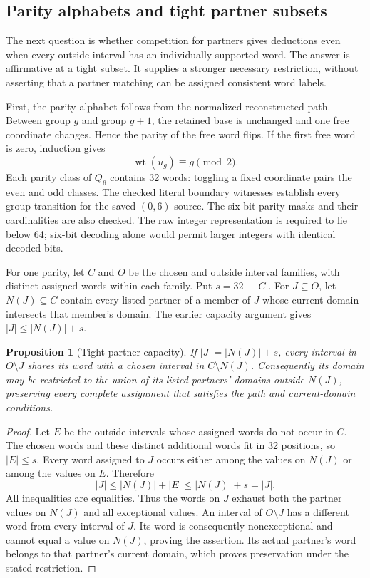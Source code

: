 \documentclass[11pt,a4paper]{article}
\newtheorem{proposition}[theorem]{Proposition}
\theoremstyle{definition}
\theoremstyle{remark}
\begin{document}
\subsection{Parity alphabets and tight partner subsets}
\label{sec:tight214}
The next question is whether competition for partners gives deductions
even when every outside interval has an individually supported word.
The answer is affirmative at a tight subset. It supplies a stronger
necessary restriction, without asserting that a partner matching can
be assigned consistent word labels.

First, the parity alphabet follows from the normalized reconstructed
path. Between group $g$ and group $g+1$, the retained base is unchanged
and one free coordinate changes. Hence the parity of the free word
flips. If the first free word is zero, induction gives
\[
\operatorname{wt}(u_g)\equiv g\pmod 2.
\]
Each parity class of $Q_6$ contains 32 words: toggling a fixed coordinate
pairs the even and odd classes. The checked literal boundary witnesses
establish every group transition for the saved $(0,6)$ source. The
six-bit parity masks and their cardinalities are also checked.
The raw integer representation is required to lie below 64; six-bit
decoding alone would permit larger integers with identical decoded bits.

For one parity, let $C$ and $O$ be the chosen and outside interval
families, with distinct assigned words within each family. Put
$s=32-|C|$. For $J\subseteq O$, let $N(J)\subseteq C$ contain every
listed partner of a member of $J$ whose current domain intersects that
member's domain. The earlier capacity argument gives
$|J|\le |N(J)|+s$.

\begin{proposition}[Tight partner capacity]\label{prop:tight214}
If $|J|=|N(J)|+s$, every interval in $O\setminus J$ shares its word
with a chosen interval in $C\setminus N(J)$. Consequently its domain
may be restricted to the union of its listed partners' domains outside
$N(J)$, preserving every complete assignment that satisfies the path
and current-domain conditions.
\end{proposition}
\begin{proof}
Let $E$ be the outside intervals whose assigned words do not occur in
$C$. The chosen words and these distinct additional words fit in 32
positions, so $|E|\le s$. Every word assigned to $J$ occurs either
among the values on $N(J)$ or among the values on $E$. Therefore
\[
|J|\le |N(J)|+|E|\le |N(J)|+s=|J|.
\]
All inequalities are equalities. Thus the words on $J$ exhaust both
the partner values on $N(J)$ and all exceptional values. An interval
of $O\setminus J$ has a different word from every interval of $J$.
Its word is consequently nonexceptional and cannot equal a value on
$N(J)$, proving the assertion. Its actual partner's word belongs to
that partner's current domain, which proves preservation under the
stated restriction.
\end{proof}
\end{document}
